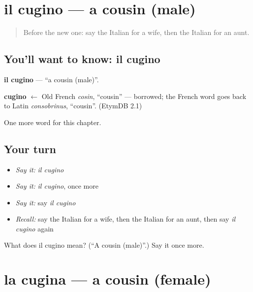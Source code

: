 \section[il cugino]{il cugino — a cousin (male)}

\label{lesson:IT-C45-cugino}



\begin{quote}
Before the new one: say the Italian for a wife, then the Italian for an aunt.
\end{quote}

\subsection*{You'll want to know: il cugino}
\textbf{il cugino} — \textquotedblleft{}a cousin (male)\textquotedblright{}.

\begin{cousinweb}
\textbf{cugino} $\leftarrow$ Old French \emph{cosin}, \textquotedblleft{}cousin\textquotedblright{} — borrowed; the French word goes back to Latin \emph{consobrinus}, \textquotedblleft{}cousin\textquotedblright{}. (EtymDB 2.1)
\end{cousinweb}

\begin{grammarlens}[title={What you've built}]
One more word for this chapter.
\end{grammarlens}

\subsection*{Your turn}
\begin{itemize}
\raggedright
  \item \emph{Say it:} \emph{il cugino}
  \item \emph{Say it:} \emph{il cugino}, once more
  \item \emph{Say it:} say \emph{il cugino}
  \item \emph{Recall:} say the Italian for a wife, then the Italian for an aunt, then say \emph{il cugino} again
\end{itemize}

\begin{tcolorbox}[breakable,colback=teal!4,colframe=teal!35!black,title={Before you move on}]
What does il cugino mean? (\textquotedblleft{}A cousin (male)\textquotedblright{}.) Say it once more.
\end{tcolorbox}
\section[la cugina]{la cugina — a cousin (female)}

